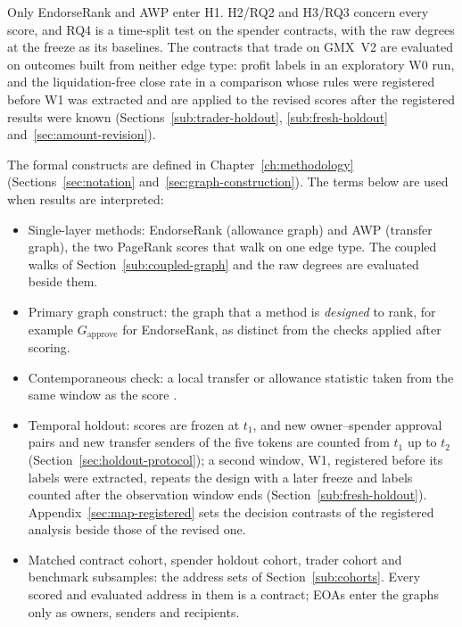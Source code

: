 Only EndorseRank and AWP enter H1. H2/RQ2 and H3/RQ3 concern every score, and RQ4 is a time-split test on the spender contracts, with the raw degrees at the freeze as its baselines. The contracts that trade on GMX~V2 are evaluated on outcomes built from neither edge type: profit labels in an exploratory W0 run, and the liquidation-free close rate in a comparison whose rules were registered before W1 was extracted and are applied to the revised scores after the registered results were known (Sections~\ref{sub:trader-holdout}, \ref{sub:fresh-holdout} and~\ref{sec:amount-revision}).


The formal constructs are defined in Chapter~\ref{ch:methodology} (Sections~\ref{sec:notation} and~\ref{sec:graph-construction}). The terms below are used when results are interpreted:

\begin{itemize}
\item Single-layer methods: EndorseRank (allowance graph) and AWP (transfer graph), the two PageRank scores that walk on one edge type. The coupled walks of Section~\ref{sub:coupled-graph} and the raw degrees are evaluated beside them.
\item Primary graph construct: the graph that a method is \emph{designed} to rank, for example $G_{\text{approve}}$ for EndorseRank, as distinct from the checks applied after scoring.
\item Contemporaneous check: a local transfer or allowance statistic taken from the same window as the score \parencite{cronbach1955construct}.
\item Temporal holdout: scores are frozen at $t_1$, and new owner--spender approval pairs and new transfer senders of the five tokens are counted from $t_1$ up to $t_2$ (Section~\ref{sec:holdout-protocol}); a second window, W1, registered before its labels were extracted, repeats the design with a later freeze and labels counted after the observation window ends (Section~\ref{sub:fresh-holdout}). Appendix~\ref{sec:map-registered} sets the decision contrasts of the registered analysis beside those of the revised one.
\item Matched contract cohort, spender holdout cohort, trader cohort and benchmark subsamples: the address sets of Section~\ref{sub:cohorts}. Every scored and evaluated address in them is a contract; EOAs enter the graphs only as owners, senders and recipients.
\end{itemize}

